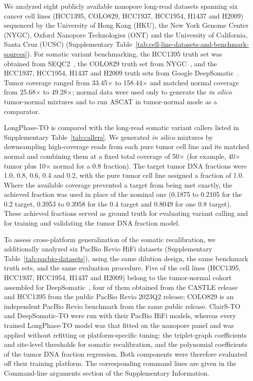 \documentclass[pdflatex,sn-nature]{sn-jnl}
\begin{document}
We analyzed eight publicly available nanopore long-read datasets spanning six cancer cell lines (HCC1395, COLO829, HCC1937, HCC1954, H1437 and H2009) sequenced by the University of Hong Kong (HKU), the New York Genome Center (NYGC), Oxford Nanopore Technologies (ONT) and the University of California, Santa Cruz (UCSC) (Supplementary Table~\ref{tab:cell-line-datasets-and-benchmark-sources}). For somatic variant benchmarking, the HCC1395 truth set was obtained from SEQC2~\cite{fang2021}, the COLO829 truth set from NYGC~\cite{arora2019}, and the HCC1937, HCC1954, H1437 and H2009 truth sets from Google DeepSomatic~\cite{park2024}. Tumor coverage ranged from 33.45$\times$ to 158.44$\times$ and matched normal coverage from 25.68$\times$ to 49.28$\times$; normal data were used only to generate the \emph{in silico} tumor-normal mixtures and to run ASCAT in tumor-normal mode as a comparator.

LongPhase-TO is compared with the long-read somatic variant callers listed in Supplementary Table~\ref{tab:callers}. We generated \emph{in silico} mixtures by downsampling high-coverage reads from each pure tumor cell line and its matched normal and combining them at a fixed total coverage of 50$\times$ (for example, 40$\times$ tumor plus 10$\times$ normal for a 0.8 fraction). The target tumor DNA fractions were 1.0, 0.8, 0.6, 0.4 and 0.2, with the pure tumor cell line assigned a fraction of 1.0. Where the available coverage prevented a target from being met exactly, the achieved fraction was used in place of the nominal one (0.1875 to 0.2105 for the 0.2 target, 0.3953 to 0.3958 for the 0.4 target and 0.8049 for one 0.8 target). These achieved fractions served as ground truth for evaluating variant calling and for training and validating the tumor DNA fraction model.

To assess cross-platform generalization of the somatic recalibration, we additionally analyzed six PacBio Revio HiFi datasets (Supplementary Table~\ref{tab:pacbio-datasets}), using the same dilution design, the same benchmark truth sets, and the same evaluation procedure. Five of the cell lines (HCC1395, HCC1937, HCC1954, H1437 and H2009) belong to the tumor-normal cohort assembled for DeepSomatic~\cite{park2024}, four of them obtained from the CASTLE release and HCC1395 from the public PacBio Revio 2023Q2 release; COLO829 is an independent PacBio Revio benchmark from the same public release. ClairS-TO and DeepSomatic-TO were run with their PacBio HiFi models, whereas every trained LongPhase-TO model was that fitted on the nanopore panel and was applied without refitting or platform-specific tuning: the triplet-graph coefficients and site-level thresholds for somatic recalibration, and the polynomial coefficients of the tumor DNA fraction regression. Both components were therefore evaluated off their training platform. The corresponding command lines are given in the Command-line arguments section of the Supplementary Information.
\end{document}

